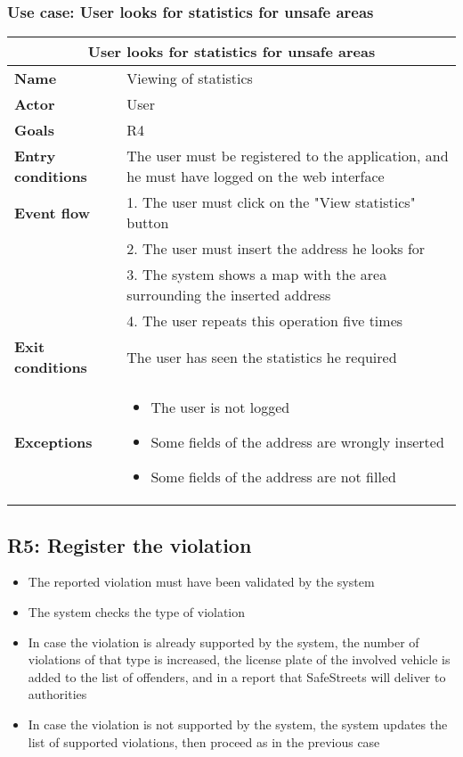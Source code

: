 \subsubsection{Use case: User looks for statistics for unsafe areas}
\begin{center}
    \begin{tabular}{|p{3cm}|p{7cm}|}
        \multicolumn{2}{c}{\textbf{User looks for statistics for unsafe areas}} \\
        \hline
        \textbf{Name} & Viewing of statistics \\
        \hline
        \textbf{Actor} & User \\
        \hline
        \textbf{Goals} & R4 \\
        \hline
        \textbf{Entry conditions} & The user must be registered to the application, and he must have logged on the web interface\\
        \hline
        \textbf{Event flow} & 1. The user must click on the "View statistics" button \\ 
        & 2. The user must insert the address he looks for \\ 
        & 3. The system shows a map with the area surrounding the inserted address \\
        & 4. The user repeats this operation five times \\
        \hline
        \textbf{Exit conditions} & The user has seen the statistics he required \\
        \hline
        \textbf{Exceptions}
        & \begin{itemize}
            \item The user is not logged
            \item Some fields of the address are wrongly inserted 
            \item Some fields of the address are not filled 
        \end{itemize} \\
        \hline
    \end{tabular}
\end{center}

\subsection{R5: Register the violation}
\begin{itemize}
    \item The reported violation must have been validated by the system
    \item The system checks the type of violation
    \item In case the violation is already supported by the system, the number of violations of that type is increased, the license plate of the involved vehicle is added to the list of offenders, and in a report that SafeStreets will deliver to authorities
    \item In case the violation is not supported by the system, the system updates the list of supported violations, then proceed as in the previous case
\end{itemize}
